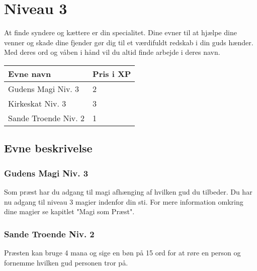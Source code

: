 \chapter{Niveau 3}
At finde syndere og kættere er din specialitet. Dine evner til at hjælpe dine venner og skade dine fjender gør dig til et værdifuldt redskab i din guds hænder. Med deres ord og våben i hånd vil du altid finde arbejde i deres navn.

\begin{table}[H]
    \centering
    \begin{tabular}{|p{}|p{}|}
    \rowcolor{cerulean!80}\hline
        Evne navn & Pris i XP \\\hline
            Gudens Magi Niv. 3 & 2\\\hline
            Kirkeskat Niv. 3 & 3\\\hline
            Sande Troende Niv. 2& 1 \\\hline
    \end{tabular}
\end{table}

\section{Evne beskrivelse}

\subsection{Gudens Magi Niv. 3}
Som præst har du adgang til magi afhænging af hvilken gud du tilbeder. Du har nu adgang til niveau 3 magier indenfor din sti. For mere information omkring dine magier se kapitlet "Magi som Præst".



\subsection{Sande Troende Niv. 2}
Præsten kan bruge 4 mana og sige en bøn på 15 ord for at røre en person og fornemme hvilken gud personen tror på. 